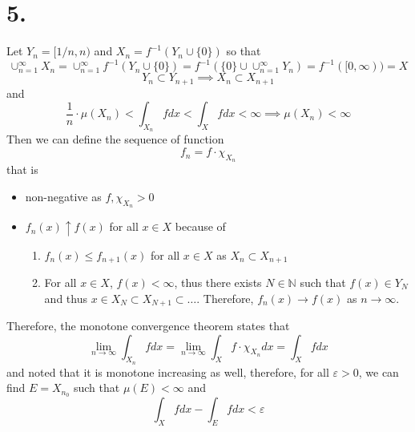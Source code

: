 \documentclass[11pt]{article}
\theoremstyle{mystyle}
\theoremstyle{definition}
\begin{document}
\section*{5.}
Let $Y_n = [1/n, n)$ and $X_n = f^{-1}(Y_n \cup \{0\})$ so that 
\[
  \cup_{n=1}^\infty X_n = \cup_{n=1}^\infty f^{-1}(Y_n \cup \{0\}) = f^{-1}(\{0\} \cup \cup_{n=1}^\infty Y_n ) = f^{-1}([0,\infty)) = X 
\]  
\[
  Y_n \subset Y_{n+1} \implies X_n \subset X_{n+1}
\]
and 
\[
  \displaystyle\frac{1}{n} \cdot \mu(X_n) < \int_{X_n} f dx < \int_X f dx < \infty \implies \mu(X_n) < \infty 
\]
Then we can define the sequence of function 
\[
  f_n = f \cdot \chi_{X_n}
\]
that is
\begin{itemize}
  \item non-negative as $f, \chi_{X_n} > 0$ 
  \item $f_n(x) \uparrow f(x)$ for all $x \in X$ because of 
    \begin{enumerate}
      \item $f_n(x) \le f_{n+1}(x)$ for all $x \in X$ as $X_n \subset X_{n+1}$ 
      \item For all $x \in X$, $f(x) < \infty$, thus there exists $N \in \mathbb{N}$ such that $f(x) \in Y_N$ and thus $x \in X_N \subset X_{N+1} \subset \hdots $. Therefore, $f_n(x) \to f(x)$ as $n \to \infty$. 
    \end{enumerate}
\end{itemize}
Therefore, the monotone convergence theorem states that 
\[
  \lim_{n \to \infty} \int_{X_n} f dx = \lim_{n \to \infty} \int_X f \cdot \chi_{X_n} dx = \int_X f dx
\]
and noted that it is monotone increasing as well, therefore, for all $\varepsilon > 0$, we can find $E = X_{n_0}$ such that $\mu(E) < \infty$ and  
\[
  \int_X f dx - \int_E f dx < \varepsilon
\]
\end{document}
